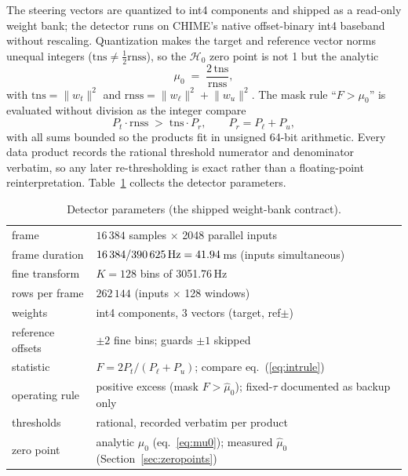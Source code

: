 The steering vectors are quantized to int4 components and shipped as a
read-only weight bank; the detector runs on CHIME's native offset-binary
int4 baseband without rescaling. Quantization makes the target and
reference vector norms unequal integers ($\mathrm{tns} \ne
\tfrac{1}{2}\mathrm{rnss}$), so the $\mathcal{H}_0$ zero point is not 1
but the analytic
\begin{equation}
  \mu_0 \;=\; \frac{2\,\mathrm{tns}}{\mathrm{rnss}},
  \label{eq:mu0}
\end{equation}
with $\mathrm{tns} = \lVert w_t \rVert^2$ and $\mathrm{rnss} =
\lVert w_\ell \rVert^2 + \lVert w_u \rVert^2$. The mask rule ``$F > \mu_0$''
is evaluated without division as the integer compare
\begin{equation}
  P_t \cdot \mathrm{rnss} \;>\; \mathrm{tns} \cdot P_r,
  \qquad P_r = P_\ell + P_u,
  \label{eq:intrule}
\end{equation}
with all sums bounded so the products fit in unsigned 64-bit arithmetic.
Every data product records the rational threshold numerator and denominator
verbatim, so any later re-thresholding is exact rather than a floating-point
reinterpretation. Table~\ref{tab:params} collects the detector parameters.

\begin{table}
  \centering
  \caption{Detector parameters (the shipped weight-bank contract).}
  \label{tab:params}
  \begin{tabular}{ll}
    \toprule
    frame & $16\,384$ samples $\times$ 2048 parallel inputs \\
    frame duration & $16\,384/390\,625\,{\rm Hz} = 41.94$\,ms
                     (inputs simultaneous) \\
    fine transform & $K = 128$ bins of 3051.76\,Hz \\
    rows per frame & $262\,144$ (inputs $\times$ 128 windows) \\
    weights & int4 components, 3 vectors (target, ref$\pm$) \\
    reference offsets & $\pm 2$ fine bins; guards $\pm 1$ skipped \\
    statistic & $F = 2P_t/(P_\ell + P_u)$; compare eq.~(\ref{eq:intrule}) \\
    operating rule & positive excess (mask $F > \hat\mu_0$); fixed-$\tau$
                     documented as backup only \\
    thresholds & rational, recorded verbatim per product \\
    zero point & analytic $\mu_0$ (eq.~\ref{eq:mu0}); measured
                 $\hat\mu_0$ (Section~\ref{sec:zeropoints}) \\
    \bottomrule
  \end{tabular}
\end{table}

